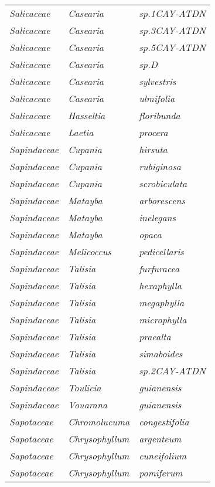 \documentclass[fleqn,10pt]{ArtEcoFoG} %
\renewenvironment{table}{\begin{table*}}{\end{table*}\ignorespacesafterend}
\begin{document}
\begin{table}
\begin{tabular}[t]{lll}
\em{Salicaceae} & \em{Casearia} & \em{sp.1CAY-ATDN}\\
\em{Salicaceae} & \em{Casearia} & \em{sp.3CAY-ATDN}\\
\addlinespace
\em{Salicaceae} & \em{Casearia} & \em{sp.5CAY-ATDN}\\
\em{Salicaceae} & \em{Casearia} & \em{sp.D}\\
\em{Salicaceae} & \em{Casearia} & \em{sylvestris}\\
\em{Salicaceae} & \em{Casearia} & \em{ulmifolia}\\
\em{Salicaceae} & \em{Hasseltia} & \em{floribunda}\\
\addlinespace
\em{Salicaceae} & \em{Laetia} & \em{procera}\\
\em{Sapindaceae} & \em{Cupania} & \em{hirsuta}\\
\em{Sapindaceae} & \em{Cupania} & \em{rubiginosa}\\
\em{Sapindaceae} & \em{Cupania} & \em{scrobiculata}\\
\em{Sapindaceae} & \em{Matayba} & \em{arborescens}\\
\addlinespace
\em{Sapindaceae} & \em{Matayba} & \em{inelegans}\\
\em{Sapindaceae} & \em{Matayba} & \em{opaca}\\
\em{Sapindaceae} & \em{Melicoccus} & \em{pedicellaris}\\
\em{Sapindaceae} & \em{Talisia} & \em{furfuracea}\\
\em{Sapindaceae} & \em{Talisia} & \em{hexaphylla}\\
\addlinespace
\em{Sapindaceae} & \em{Talisia} & \em{megaphylla}\\
\em{Sapindaceae} & \em{Talisia} & \em{microphylla}\\
\em{Sapindaceae} & \em{Talisia} & \em{praealta}\\
\em{Sapindaceae} & \em{Talisia} & \em{simaboides}\\
\em{Sapindaceae} & \em{Talisia} & \em{sp.2CAY-ATDN}\\
\addlinespace
\em{Sapindaceae} & \em{Toulicia} & \em{guianensis}\\
\em{Sapindaceae} & \em{Vouarana} & \em{guianensis}\\
\em{Sapotaceae} & \em{Chromolucuma} & \em{congestifolia}\\
\em{Sapotaceae} & \em{Chrysophyllum} & \em{argenteum}\\
\em{Sapotaceae} & \em{Chrysophyllum} & \em{cuneifolium}\\
\addlinespace
\em{Sapotaceae} & \em{Chrysophyllum} & \em{pomiferum}\\

\end{tabular}
\end{table}
\end{document}
